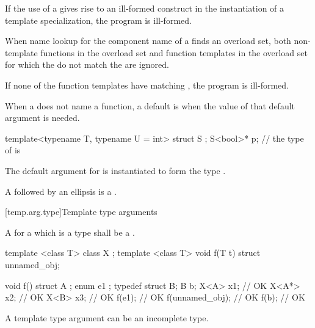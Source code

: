 \pnum
If the use of a
gives rise to an ill-formed construct in the instantiation of a
template specialization, the program is ill-formed.

\pnum
When name lookup for the component name of a
finds an overload set, both non-template functions in the overload
set and function templates in the overload set for
which the
do not match the
are ignored.
\begin{note}
If none of the function templates have matching
,
the program is ill-formed.
\end{note}

\pnum
When a  does not name a function,
a default  is
when the value of that default argument is needed.
\begin{example}
\begin{codeblock}
template<typename T, typename U = int> struct S { };
S<bool>* p;         // the type of  is 
\end{codeblock}
The default argument for  is instantiated to form the type .
\end{example}

\pnum
A  followed by an ellipsis is
a .

[temp.arg.type]{Template type arguments}

\pnum
A
for a
which is a type
shall be a
.

\pnum
\begin{example}
\begin{codeblock}
template <class T> class X { };
template <class T> void f(T t) { }
struct { } unnamed_obj;

void f() {
  struct A { };
  enum { e1 };
  typedef struct { } B;
  B b;
  X<A> x1;          // OK
  X<A*> x2;         // OK
  X<B> x3;          // OK
  f(e1);            // OK
  f(unnamed_obj);   // OK
  f(b);             // OK
}
\end{codeblock}
\end{example}
\begin{note}
A template type argument can be an incomplete type.
\end{note}

